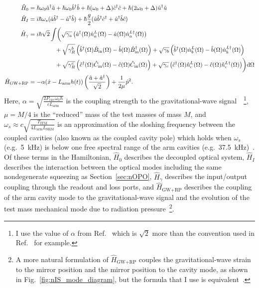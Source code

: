 \begin{align}\label{eq:nIS_Hamiltonian}
\hat H_0 &= \hbar \omega_0 \hat a^\dag \hat a + \hbar \omega_0 \hat b^\dag \hat b+ \hbar (\omega_0+\Delta) \hat c^\dag \hat c + \hbar (2\omega_0+\Delta) \hat u^\dag \hat u\\
\hat H_I &= i\hbar\omega_s(\hat a\hat b^\dag-\hat a^\dag\hat b) + \hbar \frac{g}{2} (\hat u \hat b^\dag \hat c^\dag+\hat u^\dag \hat b \hat c) \nonumber\\
\hat H_\gamma &= i\hbar \sqrt{2}\int \biggl( \sqrt{\gamma_a}\left(\hat{a}^\dag(\Omega)\hat n^L_a(\Omega)-\hat{a}(\Omega)\hat{n}^{L\dag}_a(\Omega)\right) \nonumber\\
& \hspace*{1.55cm} + \sqrt{\gamma^b_R}\left(\hat{b}^\dag(\Omega)\hat{B}_\text{in}(\Omega)-\hat{b}(\Omega)\hat{B}_\text{in}^\dag(\Omega)\right) + \sqrt{\gamma_b}\left(\hat{b}^\dag(\Omega)\hat n^L_b(\Omega)-\hat{b}(\Omega)\hat{n}^{L\dag}_b(\Omega)\right) \nonumber \\
& \hspace*{1.55cm} + \sqrt{\gamma^c_R}\left(\hat{c}^\dag(\Omega)\hat C_\text{in}(\Omega)-\hat{c}(\Omega)\hat C_\text{in}(\Omega)\right) + \sqrt{\gamma_c}\left(\hat{c}^\dag(\Omega)\hat n^L_c(\Omega)-\hat{c}(\Omega)\hat{n}^{L\dag}_c(\Omega)\right)\biggr)\text{d}\Omega \nonumber\\
\hat H_\text{GW+RP} &= -\alpha (\hat{x}-L_\mathrm{arm}h(t))\left(\frac{\hat{a}+\hat{a}^\dag}{\sqrt{2}}\right)+\frac{1}{2\mu}\hat{p}^2.\nonumber
\end{align}
Here, $\alpha=\sqrt{\frac{2 P_\text{circ} \omega_0 \hbar}{c  L_\text{arm}}}$ is the coupling strength to the gravitational-wave signal~\cite{liBroadbandSensitivityImprovement2020}~\footnote{I use the value of $\alpha$ from Ref.~\cite{liBroadbandSensitivityImprovement2020} which is $\sqrt2$ more than the convention used in Ref.~\cite{korobkoQuantumExpanderGravitationalwave2019} for example.}, $\mu=M/4$ is the ``reduced'' mass of the test masses of mass $M$, and $\omega_s\approx c\sqrt{\frac{T_\text{ITM}}{4 L_\text{arm} L_\text{SRM}}}$ is an approximation of the sloshing frequency between the coupled cavities (also known as the coupled cavity pole) which holds when $\omega_s$ (e.g.\ 5~kHz) is below one free spectral range of the arm cavities (e.g.\ 37.5~kHz)~\cite{korobkoQuantumExpanderGravitationalwave2019}.
Of these terms in the Hamiltonian, $\hat H_0$ describes the decoupled optical system, $\hat H_I$ describes the interaction between the optical modes including the same nondegenerate squeezing as Section~\ref{sec:nOPO}, $\hat H_\gamma$ describes the input/output coupling through the readout and loss ports, and $\hat H_\text{GW+RP}$ describes the coupling of the arm cavity mode to the gravitational-wave signal and the evolution of the test mass mechanical mode due to radiation pressure~\footnote{A more natural formulation of $\hat H_\text{GW+RP}$ couples the gravitational-wave strain to the mirror position and the mirror position to the cavity mode, as shown in Fig.~\ref{fig:nIS_mode_diagram}, but the formula that I use is equivalent~\cite{bowen2015quantum}.}.
